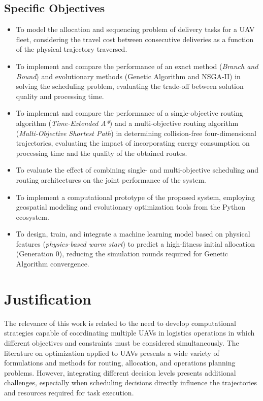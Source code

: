 \subsection{Specific Objectives}

\begin{itemize}
\item To model the allocation and sequencing problem of delivery tasks for a UAV fleet, considering the travel cost between consecutive deliveries as a function of the physical trajectory traversed.
\item To implement and compare the performance of an exact method (\textit{Branch and Bound}) and evolutionary methods (Genetic Algorithm and NSGA-II) in solving the scheduling problem, evaluating the trade-off between solution quality and processing time.
\item To implement and compare the performance of a single-objective routing algorithm (\textit{Time-Extended A*}) and a multi-objective routing algorithm (\textit{Multi-Objective Shortest Path}) in determining collision-free four-dimensional trajectories, evaluating the impact of incorporating energy consumption on processing time and the quality of the obtained routes.
\item To evaluate the effect of combining single- and multi-objective scheduling and routing architectures on the joint performance of the system.
\item To implement a computational prototype of the proposed system, employing geospatial modeling and evolutionary optimization tools from the Python ecosystem.
\item To design, train, and integrate a machine learning model based on physical features (\textit{physics-based warm start}) to predict a high-fitness initial allocation (Generation 0), reducing the simulation rounds required for Genetic Algorithm convergence.
\end{itemize}

\section{Justification}

The relevance of this work is related to the need to develop computational strategies capable of coordinating multiple UAVs in logistics operations in which different objectives and constraints must be considered simultaneously. The literature on optimization applied to UAVs presents a wide variety of formulations and methods for routing, allocation, and operations planning problems. However, integrating different decision levels presents additional challenges, especially when scheduling decisions directly influence the trajectories and resources required for task execution.

